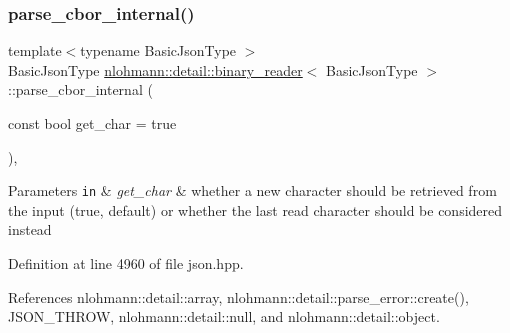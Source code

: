 \subsubsection{\texorpdfstring{parse\+\_\+cbor\+\_\+internal()}{parse\_cbor\_internal()}}
{\footnotesize\ttfamily template$<$typename Basic\+Json\+Type $>$ \\
Basic\+Json\+Type \hyperlink{classnlohmann_1_1detail_1_1binary__reader}{nlohmann\+::detail\+::binary\+\_\+reader}$<$ Basic\+Json\+Type $>$\+::parse\+\_\+cbor\+\_\+internal (\begin{DoxyParamCaption}\item[{const bool}]{get\+\_\+char = {\ttfamily true} }\end{DoxyParamCaption})\hspace{0.3cm}{\ttfamily [inline]}, {\ttfamily [private]}}


\begin{DoxyParams}[1]{Parameters}
\mbox{\tt in}  & {\em get\+\_\+char} & whether a new character should be retrieved from the input (true, default) or whether the last read character should be considered instead \\
\hline
\end{DoxyParams}


Definition at line 4960 of file json.\+hpp.



References nlohmann\+::detail\+::array, nlohmann\+::detail\+::parse\+\_\+error\+::create(), J\+S\+O\+N\+\_\+\+T\+H\+R\+OW, nlohmann\+::detail\+::null, and nlohmann\+::detail\+::object.


